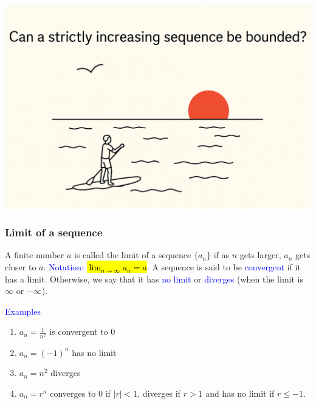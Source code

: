 \documentclass[11pt,aspectratio=169]{beamer}
\begin{document}
{
\begin{frame}[plain]
\noindent
\includegraphics[scale=.25]{vbreaks/question1.png}
\end{frame}
}


\begin{frame}
\frametitle{Limit of a sequence}


 A finite number $a$ is called the \alert{limit} of a sequence $\{a_n\}$ if as $n$ gets larger, $a_n$ gets closer to $a$. \textcolor{blue}{Notation:} \hl{$\lim_{n \rightarrow \infty} a_n=a$}.
\vskip 12pt
A sequence is said to be \textcolor{blue}{convergent} if it has a limit. Otherwise, we say that it has \textcolor{blue}{no limit} or  \textcolor{blue}{diverges} (when the limit is $\infty$ or $-\infty$).

\vskip 12pt
\textcolor{blue}{Examples} 
\begin{enumerate}
\item $a_n=\frac{1}{n^2}$ is convergent to 0

\item $a_n=(-1)^n$ has no limit

\item $a_n=n^2$ diverges

\item $a_n=r^n$ converges to $0$ if  $\vert r \vert <1$, diverges if $r>1$ and has no limit if $r\leq -1$.

\end{enumerate}

 


\end{frame}
\end{document}
